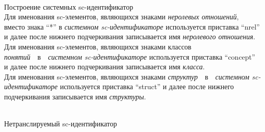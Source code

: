 \begin{frame}{\\Построение системных sc-идентификатор}
	\topline
	\justifying
	\vspace*{\fill}\\
	 Для именования sc-элементов, являющихся знаками \textit{неролевых отношений}, вместо знака ``*'' в \textit{системном sc-идентификаторе} используется приставка ``nrel'' и далее после нижнего подчеркивания записывается имя \textit{неролевого отношения}.\\
	
	Для именования sc-элементов, являющихся знаками классов \textit{понятий}~~в~~\textit{системном sc-идентификаторе} используется приставка ``concept'' и далее после нижнего подчеркивания записывается имя \textit{класса}.\\
	
	Для именования sc-элементов, являющихся знаками \textit{структур}~~в~~\textit{системном sc-идентификаторе} используется приставка ``struct'' и далее после нижнего подчеркивания записывается имя \textit{структуры}.
\end{frame}

\begin{frame}{\\Нетранслируемый sc-идентификатор}
	\topline
	\justifying
\begin{SCn}
\end{SCn}
	
\end{frame}


